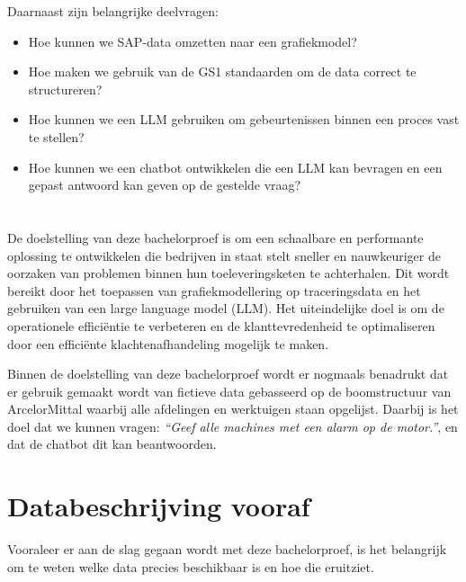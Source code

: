 Daarnaast zijn belangrijke deelvragen:
\begin{itemize}
    \item Hoe kunnen we SAP-data omzetten naar een grafiekmodel?
    \item Hoe maken we gebruik van de GS1 standaarden om de data correct te structureren?
    \item Hoe kunnen we een LLM gebruiken om gebeurtenissen binnen een proces vast te stellen?
    \item Hoe kunnen we een chatbot ontwikkelen die een LLM kan bevragen en een gepast antwoord kan geven op de gestelde vraag?
\end{itemize}
\section{}%
\label{sec:onderzoeksdoelstelling}

De doelstelling van deze bachelorproef is om een schaalbare en performante oplossing te ontwikkelen die bedrijven in staat stelt sneller en nauwkeuriger de oorzaken van problemen binnen hun toeleveringsketen te achterhalen.
Dit wordt bereikt door het toepassen van grafiekmodellering op traceringsdata en het gebruiken van een large language model (LLM). 
Het uiteindelijke doel is om de operationele efficiëntie te verbeteren en de klanttevredenheid te optimaliseren door een efficiënte klachtenafhandeling mogelijk te maken.

Binnen de doelstelling van deze bachelorproef wordt er nogmaals benadrukt dat er gebruik gemaakt wordt van fictieve data gebasseerd op de boomstructuur van ArcelorMittal waarbij alle afdelingen en werktuigen staan opgelijst. 
Daarbij is het doel dat we kunnen vragen: \emph{``Geef alle machines met een alarm op de motor.''}, en dat de chatbot dit kan beantwoorden.

\section{Databeschrijving vooraf}\label{sec:dataopstelling}
Vooraleer er aan de slag gegaan wordt met deze bachelorproef, is het belangrijk om te weten welke data precies beschikbaar is en hoe die eruitziet.

